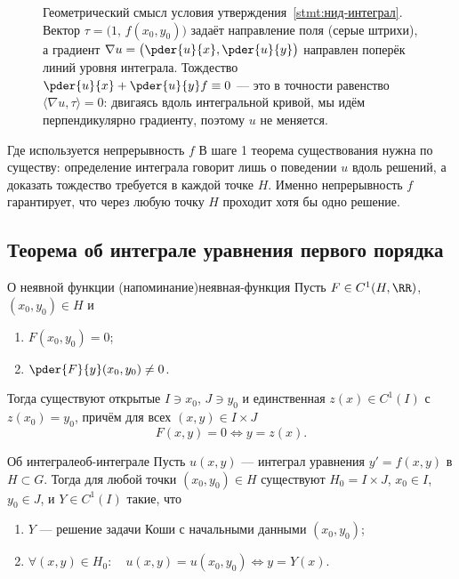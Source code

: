 \begin{figure}[H]
\begin{Addon}
		\caption{Геометрический смысл условия утверждения~\ref{stmt:нид-интеграл}. Вектор
			$\tau = \bigl(1,\, f(x_0,y_0)\bigr)$ задаёт направление поля (серые
			штрихи), а
			градиент $\nabla u = \bigl(\pder{u}{x}, \pder{u}{y}\bigr)$ направлен
			поперёк линий уровня интеграла. Тождество
			$\pder{u}{x} + \pder{u}{y} f \equiv 0$ --- это в точности равенство
			$\langle \nabla u, \tau\rangle = 0$: двигаясь вдоль интегральной кривой,
			мы идём перпендикулярно градиенту, поэтому $u$ не меняется.}
		\label{fig:градиент-поле}
	\end{Addon}
\end{figure}

\begin{Remark}[addon]{Где используется непрерывность $f$}{}
	В шаге 1 теорема существования нужна по существу: определение интеграла
	говорит лишь о поведении $u$ вдоль решений, а доказать тождество требуется
	в каждой точке $H$. Именно непрерывность $f$ гарантирует, что через любую
	точку $H$ проходит хотя бы одно решение.
\end{Remark}

\subsection{Теорема об интеграле уравнения первого порядка}

\begin{Theorem}{О неявной функции (напоминание)}{неявная-функция}
	Пусть $F \in C^1(H,\RR)$, $(x_0,y_0) \in H$ и
	\begin{enumerate}
		\item $F(x_0,y_0) = 0$;
		\item $\pder{F}{y}(x_0,y_0) \neq 0$.
	\end{enumerate}
	Тогда существуют открытые $I \ni x_0$, $J \ni y_0$ и единственная
	$z(x) \in C^1(I)$ с $z(x_0) = y_0$, причём для всех $(x,y) \in I \times J$
	\[
	F(x,y) = 0 \iff y = z(x).
	\]
\end{Theorem}

\begin{Theorem}{Об интеграле}{об-интеграле}
	Пусть $u(x,y)$ --- интеграл уравнения $y' = f(x,y)$ в $H \subset G$. Тогда
	для любой точки $(x_0,y_0) \in H$ существуют $H_0 = I \times J$,
	$x_0 \in I$, $y_0 \in J$, и $Y \in C^1(I)$ такие, что
	\begin{enumerate}
		\item $Y$ --- решение задачи Коши с начальными данными $(x_0,y_0)$;
		\item $\forall (x,y) \in H_0 \colon\quad u(x,y) = u(x_0,y_0) \iff y = Y(x)$.
	\end{enumerate}
\end{Theorem}

